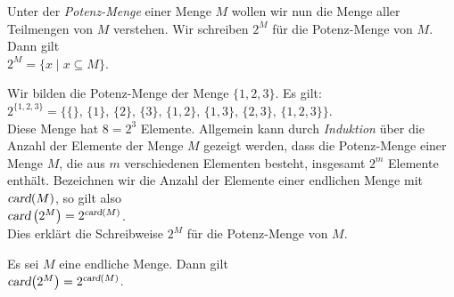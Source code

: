 Unter der \emph{Potenz-Menge} einer Menge $M$ wollen wir nun die Menge aller Teilmengen
von $M$ verstehen.  Wir schreiben $2^M$ f\"{u}r die Potenz-Menge von $M$.  Dann gilt \\[0.2cm]
\hspace*{1.3cm} $2^M = \{ x \;|\; x \subseteq M \}$.
\vspace{0.2cm}

\example
Wir bilden  die Potenz-Menge der Menge $\{1,2,3\}$.  Es gilt: \\[0.2cm]
\hspace*{1.3cm} $2^{\{1,2,3\}} = \big\{ \{\},\, \{1\}, \, \{2\},\, \{3\},\, \{1,2\}, \, \{1,3\}, \, \{2,3\},\, \{1,2,3\}\big\}$. \\[0.2cm]
Diese Menge hat $8 = 2^3$ Elemente.  Allgemein kann durch \emph{Induktion} \"{u}ber die Anzahl der
Elemente der Menge $M$ gezeigt werden, dass die 
Potenz-Menge einer Menge $M$, die aus $m$ verschiedenen Elementen besteht, insgesamt $2^m$ 
Elemente enth\"{a}lt.  Bezeichnen wir die Anzahl der Elemente einer endlichen Menge mit
$\textsl{card}(M)$, so gilt also
\\[0.2cm]
\hspace*{1.3cm}
$\textsl{card}\left(2^M\right) = 2^{\textsl{card}(M)}$.
\\[0.2cm]
Dies erkl\"{a}rt die Schreibweise $2^M$ f\"{u}r die Potenz-Menge von $M$.  \eox


\begin{Satz}
Es sei $M$ eine endliche Menge.  Dann gilt
\\[0.2cm]
\hspace*{1.3cm}
$\textsl{card}\bigl(2^M\bigr) = 2^{\textsl{card}(M)}$.
\end{Satz}

